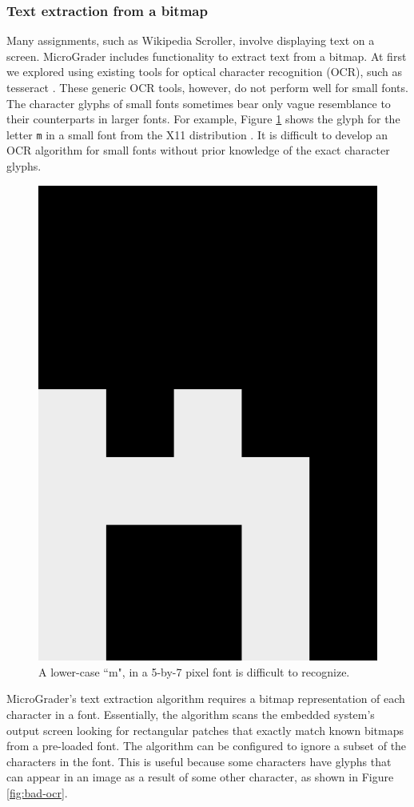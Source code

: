 \documentclass[12pt]{article}
\begin{document}
\subsubsection{Text extraction from a bitmap}
Many assignments, such as Wikipedia Scroller, involve displaying text on a screen.  MicroGrader includes functionality to extract text from a bitmap.  At first we explored using existing tools for optical character recognition (OCR), such as tesseract \cite{tesseract}.  These generic OCR tools, however, do not perform well for small fonts.  The character glyphs of small fonts sometimes bear only vague resemblance to their counterparts in larger fonts.  For example, Figure \ref{fig:small-glyph} shows the glyph for the letter \texttt{m} in a small font from the X11 distribution \cite{5x7}.  It is difficult to develop an OCR algorithm for small fonts without prior knowledge of the exact character glyphs.


\begin{figure}
\centering
\includegraphics[width=0.3\linewidth]{glyph-m.png}
\caption{A lower-case ``m", in a 5-by-7 pixel font is difficult to recognize.}
\label{fig:small-glyph}
\end{figure}

MicroGrader's text extraction algorithm requires a bitmap representation of each character in a font.  Essentially, the algorithm scans the embedded system's output screen looking for rectangular patches that exactly match known bitmaps from a pre-loaded font.  The algorithm can be configured to ignore a subset of the characters in the font.  This is useful because some characters have glyphs that can appear in an image as a result of some other character, as shown in Figure \ref{fig:bad-ocr}.
\end{document}
